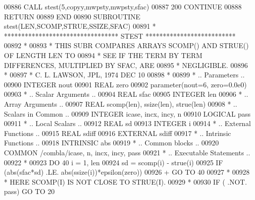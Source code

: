 \begin{DoxyCode}
00886          \textcolor{keyword}{CALL }stest(5,copyy,mwpsty,mwpsty,sfac)
00887   200 \textcolor{keywordflow}{CONTINUE}
00888       \textcolor{keywordflow}{RETURN}
00889 \textcolor{keyword}{      END}
00890 \textcolor{keyword}{      SUBROUTINE }stest(LEN,SCOMP,STRUE,SSIZE,SFAC)
00891 \textcolor{comment}{*     ********************************* STEST **************************}
00892 \textcolor{comment}{*}
00893 \textcolor{comment}{*     THIS SUBR COMPARES ARRAYS  SCOMP() AND STRUE() OF LENGTH LEN TO}
00894 \textcolor{comment}{*     SEE IF THE TERM BY TERM DIFFERENCES, MULTIPLIED BY SFAC, ARE}
00895 \textcolor{comment}{*     NEGLIGIBLE.}
00896 \textcolor{comment}{*}
00897 \textcolor{comment}{*     C. L. LAWSON, JPL, 1974 DEC 10}
00898 \textcolor{comment}{*}
00899 \textcolor{comment}{*     .. Parameters ..}
00900       \textcolor{keywordtype}{INTEGER}          nout
00901       \textcolor{keywordtype}{REAL}             zero
00902       parameter(nout=6, zero=0.0e0)
00903 \textcolor{comment}{*     .. Scalar Arguments ..}
00904       \textcolor{keywordtype}{REAL}             sfac
00905       \textcolor{keywordtype}{INTEGER}          len
00906 \textcolor{comment}{*     .. Array Arguments ..}
00907       \textcolor{keywordtype}{REAL}             scomp(len), ssize(len), strue(len)
00908 \textcolor{comment}{*     .. Scalars in Common ..}
00909       \textcolor{keywordtype}{INTEGER}          icase, incx, incy, n
00910       \textcolor{keywordtype}{LOGICAL}          pass
00911 \textcolor{comment}{*     .. Local Scalars ..}
00912       \textcolor{keywordtype}{REAL}             sd
00913       \textcolor{keywordtype}{INTEGER}          i
00914 \textcolor{comment}{*     .. External Functions ..}
00915       \textcolor{keywordtype}{REAL}             sdiff
00916       \textcolor{keywordtype}{EXTERNAL}         sdiff
00917 \textcolor{comment}{*     .. Intrinsic Functions ..}
00918       \textcolor{keywordtype}{INTRINSIC}        abs
00919 \textcolor{comment}{*     .. Common blocks ..}
00920       \textcolor{keyword}{COMMON}           /combla/icase, n, incx, incy, pass
00921 \textcolor{comment}{*     .. Executable Statements ..}
00922 \textcolor{comment}{*}
00923       \textcolor{keywordflow}{DO} 40 i = 1, len
00924          sd = scomp(i) - strue(i)
00925          \textcolor{keywordflow}{IF} (abs(sfac*sd) .LE. abs(ssize(i))*epsilon(zero))
00926      +       \textcolor{keywordflow}{GO TO} 40
00927 \textcolor{comment}{*}
00928 \textcolor{comment}{*                             HERE    SCOMP(I) IS NOT CLOSE TO STRUE(I).}
00929 \textcolor{comment}{*}
00930          \textcolor{keywordflow}{IF} ( .NOT. pass) \textcolor{keywordflow}{GO TO} 20

\end{DoxyCode}
